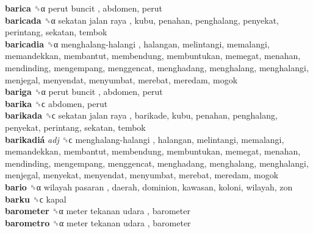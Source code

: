 \textbf{barica} ␝α   perut buncit , abdomen, perut  \\
\textbf{baricada} ␝α   sekatan jalan raya , kubu, penahan, penghalang, penyekat, perintang, sekatan, tembok  \\
\textbf{baricadia} ␝α   menghalang-halangi , halangan, melintangi, memalangi, memandekkan, membantut, membendung, membuntukan, memegat, menahan, mendinding, mengempang, menggencat, menghadang, menghalang, menghalangi, menjegal, menyendat, menyumbat, merebat, meredam, mogok  \\
\textbf{bariga} ␝α   perut buncit , abdomen, perut  \\
\textbf{barika} ␝ϲ  abdomen, perut  \\
\textbf{barikada} ␝ϲ   sekatan jalan raya , barikade, kubu, penahan, penghalang, penyekat, perintang, sekatan, tembok  \\
\textbf{barikadiá} \emph{adj}  ␝ϲ   menghalang-halangi , halangan, melintangi, memalangi, memandekkan, membantut, membendung, membuntukan, memegat, menahan, mendinding, mengempang, menggencat, menghadang, menghalang, menghalangi, menjegal, menyekat, menyendat, menyumbat, merebat, meredam, mogok  \\
\textbf{bario} ␝α   wilayah pasaran , daerah, dominion, kawasan, koloni, wilayah, zon  \\
\textbf{barku} ␝ϲ  kapal  \\
\textbf{barometer} ␝α   meter tekanan udara , barometer  \\
\textbf{barometro} ␝α   meter tekanan udara , barometer  \\
